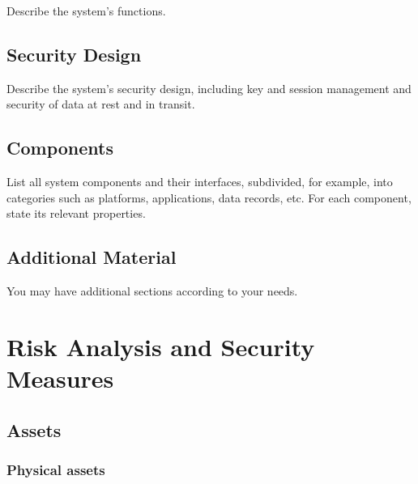 \documentclass[english]{article}
\begin{document}
Describe the system's functions.


\subsection{Security Design}

Describe the system's security design, including key and session management and 
security of data at rest and in transit.


\subsection{Components}

List all system components and their interfaces, subdivided, for example, into
  categories such as platforms, applications, data records, etc. For
  each component, state its relevant properties.



\subsection{Additional Material}

You may have additional sections according to your needs.


\section{Risk Analysis and Security Measures}

\subsection{Assets}

\subsubsection{Physical assets}
\end{document}
